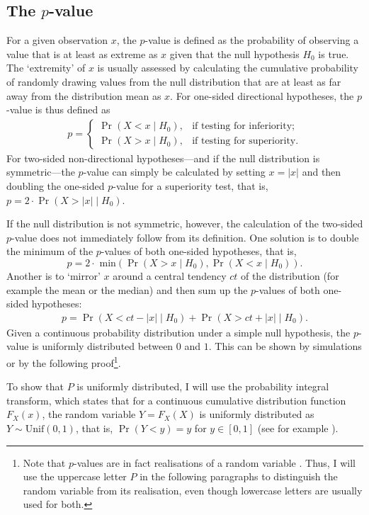 \subsection{The \texorpdfstring{$p$}{p}-value}
\label{subsec:p-value}
For a given observation $x$, the $p$-value is defined as the probability of observing a value that is at least as extreme as $x$ given that the null hypothesis $H_0$ is true. The `extremity' of $x$ is usually assessed by calculating the cumulative probability of randomly drawing values from the null distribution that are at least as far away from the distribution mean as $x$. For one-sided directional hypotheses, the $p$-value is thus defined as
\begin{align*}
    p = \begin{cases} \Pr(X < x \mid H_0), & \text{if testing for inferiority;} \\
    \Pr(X > x \mid H_0), & \text{if testing for superiority.}\end{cases}
\end{align*}
For two-sided non-directional hypotheses---and if the null distribution is symmetric---the $p$-value can simply be calculated by setting ${x = |x|}$ and then doubling the one-sided $p$-value for a superiority test, that is, ${p = 2\cdot \Pr(X > |x| \mid H_0)}$.\par 
If the null distribution is not symmetric, however, the calculation of the two-sided $p$-value does not immediately follow from its definition. One solution is to double the minimum of the $p$-values of both one-sided hypotheses, that is, $$p = 2\cdot\text{ min}(\Pr(X > x \mid H_0), \Pr(X < x \mid H_0)).$$ Another is to `mirror' $x$ around a central tendency $ct$ of the distribution (for example the mean or the median) and then sum up the $p$-values of both one-sided hypotheses:
\begin{align*}
    p = \Pr(X < ct-|x| \mid H_0) + \Pr(X > ct+|x| \mid H_0).
\end{align*}
Given a continuous probability distribution under a simple null hypothesis, the $p$-value is uniformly distributed between $0$ and $1$. This can be shown by simulations or by the following proof\footnote{Note that $p$-values are in fact realisations of a random variable \citep{murdoch_values_2008}. Thus, I will use the uppercase letter $P$ in the following paragraphs to distinguish the random variable from its realisation, even though lowercase letters are usually used for both.}.\par
To show that $P$ is uniformly distributed, I will use the probability integral transform, which states that for a continuous cumulative distribution function $F_X(x)$, the random variable $Y = F_X(X)$ is uniformly distributed as $Y \sim \text{Unif}(0,1)$, that is, ${\Pr(Y < y) = y}$ for ${y \in [0, 1]}$ (see for example \citet[p.~ 54f.]{casella_statistical_2002}).\par
